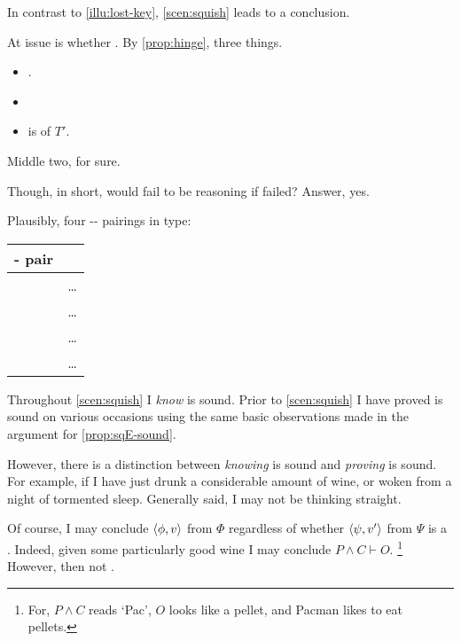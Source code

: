 \begin{note}
  In contrast to \autoref{illu:lost-key}, \autoref{scen:squish} leads to a conclusion.

  At issue is whether \requ{}.
  By \autoref{prop:hinge}, three things.
  \begin{itemize}
  \item
    \tCV{}.
  \item
    \tRep{}
  \item
    \sqE{} is \tI{} of \(T'\).
  \end{itemize}

  Middle two, for sure.

  Though, in short, would fail to be reasoning if failed?
  Answer, yes.

  Plausibly, four -- pairings in type:

  \begin{center}
    \begin{tabular}{R{.45\textwidth} L{.45\textwidth}}
      - pair &  \\
      \hline
       & \dots \\
       & \dots \\
       & \dots \\
       & \dots \\
    \end{tabular}
  \end{center}

  Throughout \autoref{scen:squish} I \emph{know} \sqE{} is sound.
  Prior to \autoref{scen:squish} I have proved \sqE{} is sound on various occasions using the same basic observations made in the argument for \autoref{prop:sqE-sound}.

  However, there is a distinction between \emph{knowing} \sqE{} is sound and \emph{proving} \sqE{} is sound.
  For example, if I have just drunk a considerable amount of wine, or woken from a night of tormented sleep.
  Generally said, I may not be thinking straight.

  Of course, I may conclude \(\langle \phi, v \rangle\) from \(\Phi\) regardless of whether \(\langle \psi, v' \rangle\) from \(\Psi\) is a \fc{}.
  Indeed, given some particularly good wine I may conclude \(P \land C \vdash O\).%
  \footnote{
    For, \(P \land C\) reads `Pac', \(O\) looks like a pellet, and Pacman likes to eat pellets.
  }
  However, then not \tCV{}.
\end{note}

